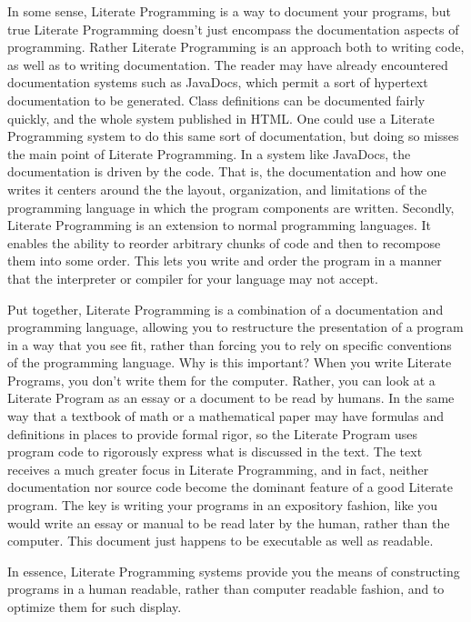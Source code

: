 In some sense, Literate Programming is a way to document
your programs, but true Literate Programming doesn't just encompass
the documentation aspects of programming.  Rather Literate Programming
is an approach both to writing code, as well as to writing
documentation.  The reader may have already encountered documentation
systems such as JavaDocs, which permit a sort of hypertext
documentation to be generated.  Class definitions can be documented
fairly quickly, and the whole system published in HTML.  One could use
a Literate Programming system to do this same sort of documentation,
but doing so misses the main point of Literate Programming.  In a
system like JavaDocs, the documentation is driven by the code.  That
is, the documentation and how one writes it centers around the the
layout, organization, and limitations of the programming language in
which the program components are written.  Secondly, Literate
Programming is an extension to normal programming languages.  It
enables the ability to reorder arbitrary chunks of code and then to
recompose them into some order.  This lets you write and order the
program in a manner that the interpreter or compiler for your language
may not accept.

Put together, Literate Programming is a combination of a documentation
and programming language, allowing you to restructure the presentation
of a program in a way that you see fit, rather than forcing you to
rely on specific conventions of the programming language.  Why is this
important?  When you write Literate Programs, you don't write them for
the computer.  Rather, you can look at a Literate Program as an essay
or a document to be read by humans.  In the same way that a textbook
of math or a mathematical paper may have formulas and definitions in
places to provide formal rigor, so the Literate Program uses program
code to rigorously express what is discussed in the text.  The text
receives a much greater focus in Literate Programming, and in fact,
neither documentation nor source code become the dominant feature of a
good Literate program.  The key is writing your programs in an
expository fashion, like you would write an essay or manual to be read
later by the human, rather than the computer.  This document just
happens to be executable as well as readable.

In essence, Literate Programming systems provide you the means of
constructing programs in a human readable, rather than computer
readable fashion, and to optimize them for such display.

